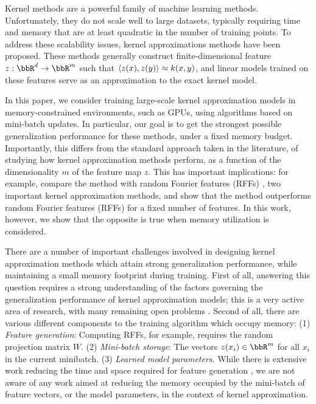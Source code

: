 Kernel methods are a powerful family of machine learning methods.  Unfortunately, they do not scale well to large datasets, typically requiring time and memory that are at least quadratic in the number of training points. To address these scalability issues, kernel approximations methods have been proposed. These methods generally construct finite-dimensional feature $z: \RR^d \rightarrow \RR^m$ such that $\langle z(x),z(y) \rangle \approx k(x,y)$, and linear models trained on these features serve as an approximation to the exact kernel model. 

In this paper, we consider training large-scale kernel approximation models in memory-constrained environments, such as GPUs, using algorithms based on mini-batch updates. In particular, our goal is to get the strongest possible generalization performance for these methods, under a fixed memory budget.  Importantly, this differs from the standard approach taken in the literature, of studying how kernel approximation methods perform, as a function of the dimensionality $m$ of the feature map $z$. This has important implications: for example, \citet{nysvsrff12} compare the \Nystrom method \citep{nystrom} with random Fourier features (RFFs) \citep{rahimi07random}, two important kernel approximation methods, and show that the \Nystrom method \citep{nystrom} outperforms random Fourier features (RFFs) \citep{rahimi07random} for a fixed number of features.  In this work, however, we show that the opposite is true when memory utilization is considered.

There are a number of important challenges involved in designing kernel approximation methods which attain strong generalization performance, while maintaining a small memory footprint during training.  First of all, answering this question requires a strong understanding of the factors governing the generalization performance of kernel approximation models; this is a very active area of research, with many remaining open problems \citep{rudi17,avron17,musco17,bach17}. Second of all, there are various different components to the training algorithm which occupy memory: (1) \textit{Feature generation}: Computing RFFs, for example, requires the random projection matrix $W$. (2) \textit{Mini-batch storage}: The vectors $z(x_i)\in\RR^m$ for all $x_i$ in the current minibatch. (3) \textit{Learned model parameters}. While there is extensive work reducing the time and space required for feature generation \citep{fastfood,yu15,sphereRKS}, we are not aware of any work aimed at reducing the memory occupied by the mini-batch of feature vectors, or the model parameters, in the context of kernel approximation.

